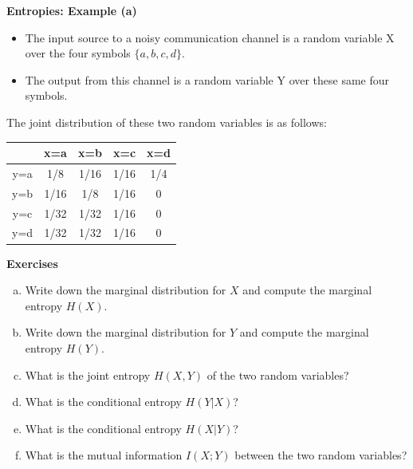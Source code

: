 \documentclass[a4paper,12pt]{article}
\begin{document}
\large 
\noindent \textbf{Entropies: Example (a)}
\begin{itemize}
\item The input source to a noisy communication channel is a random variable X over the
four symbols $\{a, b, c, d\}$. \item  The output from this channel is a random variable Y over these same
four symbols.
\end{itemize}

\medskip 

\noindent The joint distribution of these two random variables is as follows:\\ \bigskip
\begin{center}
\begin{tabular}{|c|c|c|c|c|}
\hline
&x=a& x=b & x=c & x=d \\ \hline
y=a &1/8 &1/16 &1/16 &1/4 \\ \hline
y=b &1/16 & 1/8& 1/16& 0 \\ \hline
y=c & 1/32&1/32 & 1/16 & 0\\ \hline
y=d & 1/32& 1/32& 1/16 & 0\\ \hline 
\end{tabular}
\end{center}


\noindent \textbf{Exercises}
\begin{enumerate}[(a)]
 \item Write down the marginal distribution for $X$ and compute the marginal entropy $H(X)$.
\item Write down the marginal distribution for $Y$ and compute the marginal entropy $H(Y )$.
\item What is the joint entropy $H(X, Y ) $ of the two random variables?
\item What is the conditional entropy $H(Y|X)$?
\item What is the conditional entropy $H(X|Y)$?
\item What is the mutual information $I(X;Y)$ between the two random variables?
\end{enumerate}


\newpage 
\end{document}
